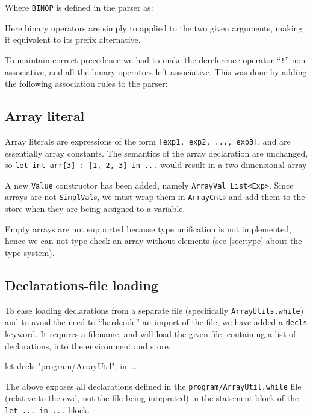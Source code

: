 \documentclass{article}
\begin{document}
Where {\tt BINOP} is defined in the parser as:
Here binary operators are simply to applied to the two given
arguments, making it equivalent to its prefix alternative.

To maintain correct precedence we had to make the dereference operator
``{\tt !}''  non-associative, and all the binary operators
left-associative. This was done by adding the following association
rules to the parser:
\begin{fs}
\end{fs}


\subsection{Array literal}
Array literals are expressions of the form {\tt [exp1, exp2, ..., exp3]}, and are essentially array constants. The semantics of the array declaration are unchanged, so {\tt let int arr[3] : [1, 2, 3] in ...} would result in a two-dimensional array

A new {\tt Value} constructor has been added, namely {\tt ArrayVal List<Exp>}. Since arrays are not {\tt SimplVal}s, we must wrap them in {\tt ArrayCnt}s and add them to the store when they are being assigned to a variable.

Empty arrays are not supported because type unification is not implemented, hence we can not type check an array without elements (see \ref{sec:type} about the type system).

\subsection{Declarations-file loading}

To ease loading declarations from a separate file (specifically {\tt ArrayUtils.while}) and to avoid the need to ``hardcode'' an import of the file, we have added a {\tt decls} keyword. It requires a filename, and will load the given file, containing a list of declarations, into the environment and store.

\begin{fs}
let decls "program/ArrayUtil"; in ...
\end{fs}

The above exposes all declarations defined in the {\tt program/ArrayUtil.while} file (relative to the cwd, not the file being intepreted) in the statement block of the {\tt let ... in ...} block.
\end{document}
